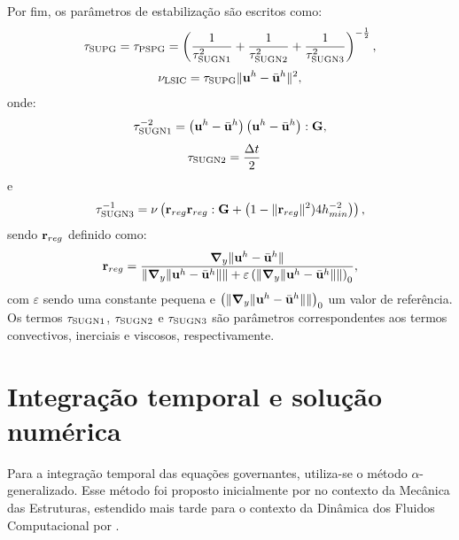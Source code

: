 Por fim, os parâmetros de estabilização são escritos como:
\begin{align}
	\tau_{\mathrm{SUPG}} = \tau_{\mathrm{PSPG}} =\left(\frac{1}{\tau_{\mathrm{SUGN1}}^2} + \frac{1}{\tau_{\mathrm{SUGN2}}^2} + \frac{1}{\tau_{\mathrm{SUGN3}}^2} \right)^{-\frac{1}{2}}, \label{eq:tsupg_tpspg_cap2}
\end{align}
\begin{align}
	\nu_{\mathrm{LSIC}} = \tau_{\mathrm{SUPG}} \lVert\mathbf{u}^h - \bar{\mathbf{u}}^h\rVert^2 \label{eq:tlsic_cap2},
\end{align}
\noindent onde:
\begin{align}
	\tau_{\mathrm{SUGN1}}^{-2} = \left(\mathbf{u}^h - \bar{\mathbf{u}}^h \right) \left(\mathbf{u}^h - \bar{\mathbf{u}}^h \right) : \mathbf{G} ,
\end{align}
\begin{align}
	\tau_{\mathrm{SUGN2}}&=\frac{\Delta t}{2}
\end{align}
\noindent e
\begin{align}
	\tau_{\mathrm{SUGN3}}^{-1} = \nu \left(\mathbf{r}_{reg}\mathbf{r}_{reg} : \mathbf{G} + \left(1 - \lVert\mathbf{r}_{reg}\rVert^2)4h_{min}^{-2} \right)\right),
\end{align}
\noindent sendo $\mathbf{r}_{reg}$ definido como:
\begin{align}
	\mathbf{r}_{reg} =\frac{\boldsymbol{\nabla}_y \lVert\mathbf{u}^h - \bar{\mathbf{u}}^h\rVert}{\lVert \boldsymbol{\nabla}_y \lVert\mathbf{u}^h - \bar{\mathbf{u}}^h\rVert\rVert + \varepsilon\left(\lVert \boldsymbol{\nabla}_y \lVert\mathbf{u}^h - \bar{\mathbf{u}}^h\rVert\rVert\right)_0},
\end{align}
\noindent com $\varepsilon$ sendo uma constante pequena e $\left(\lVert \boldsymbol{\nabla}_y \lVert\mathbf{u}^h- \bar{\mathbf{u}}^h\rVert\rVert\right)_0$ um valor de referência. Os termos $\tau_{\mathrm{SUGN1}}$, $\tau_{\mathrm{SUGN2}}$ e $\tau_{\mathrm{SUGN3}}$ são parâmetros correspondentes aos termos convectivos, inerciais e viscosos, respectivamente.

\section{Integração temporal e solução numérica}\label{capitulo:Cap2:IntegTemp}

Para a integração temporal das equações governantes, utiliza-se o método $\alpha$-generalizado. Esse método foi proposto inicialmente por  no contexto da Mecânica das Estruturas, estendido mais tarde para o contexto da Dinâmica dos Fluidos Computacional por .

